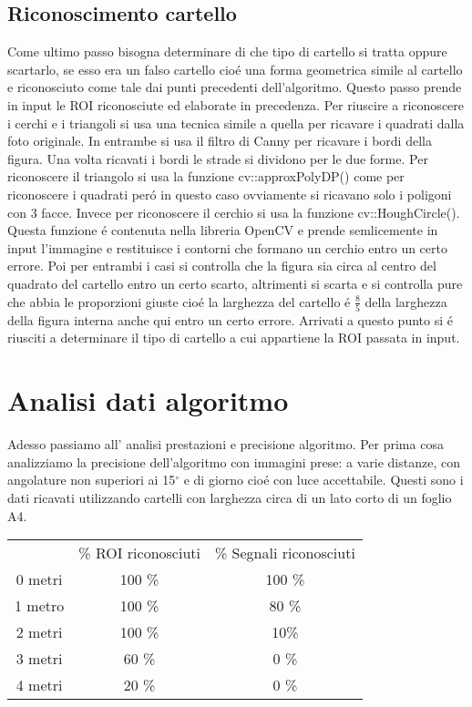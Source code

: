 \subsection{Riconoscimento cartello}

	Come ultimo passo bisogna determinare di che tipo di cartello si tratta oppure scartarlo, se esso era un falso cartello cio\'e una forma geometrica simile al cartello e riconosciuto come tale dai punti precedenti dell'algoritmo. Questo passo prende in input le ROI riconosciute ed elaborate in precedenza. Per riuscire a riconoscere i cerchi e i triangoli si usa una tecnica simile a quella per ricavare i quadrati dalla foto originale. In entrambe si usa il filtro di Canny per ricavare i bordi della figura. Una volta ricavati i bordi le strade si dividono per le due forme. Per riconoscere il triangolo si usa la funzione cv::approxPolyDP() come per riconoscere i quadrati per\'o in questo caso ovviamente si ricavano solo i poligoni con 3 facce. Invece per riconoscere il cerchio si usa la funzione cv::HoughCircle(). Questa funzione \'e contenuta nella libreria OpenCV e prende semlicemente in input l'immagine e restituisce i contorni che formano un cerchio entro un certo errore. Poi per entrambi i casi si controlla che la figura sia circa al centro del quadrato del cartello entro un certo scarto, altrimenti si scarta e si controlla pure che abbia le proporzioni giuste cio\'e la larghezza del cartello \'e $\frac{8}{5}$ della larghezza della figura interna anche qui entro un certo errore. \newline Arrivati a questo punto si \'e riusciti a determinare il tipo di cartello a cui appartiene la ROI passata in input. 

\section{Analisi dati algoritmo}

	Adesso passiamo all' analisi prestazioni e precisione algoritmo.\newline
	Per prima cosa analizziamo la precisione dell'algoritmo con immagini prese: a varie distanze, con angolature non superiori ai 15$^{\circ}$ e di giorno cio\'e con luce accettabile.
	Questi sono i dati ricavati utilizzando cartelli con larghezza circa di un lato corto di un foglio A4.

	\begin{table}[h]
		\centering
		\begin{tabular}{ccc}
		        & \% ROI riconosciuti & \% Segnali riconosciuti \\
			0 metri & 100 \%                & 100 \%               \\
			1 metro & 100 \%                & 80 \%                \\
			2 metri & 100 \%                 & 10\%               \\
			3 metri & 60 \%                  & 0 \%                 \\
			4 metri & 20 \%                  & 0 \%                
		\end{tabular}
	\end{table}

